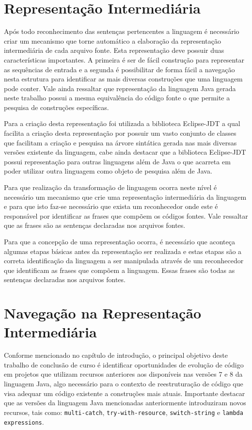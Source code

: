 \section{Representação Intermediária}\label{sec:parser}
Após todo reconhecimento das sentenças pertencentes a linguagem é necessário criar um mecanismo que torne automático a elaboração da representação intermediária de cada arquivo fonte. Esta representação deve possuir duas características importantes. A primeira é ser de fácil construção para representar as sequências de entrada e a segunda é possibilitar de forma fácil a navegação nesta estrutura para identificar as mais diversas construções que uma linguagem pode conter. Vale ainda ressaltar que representação da linguagem Java gerada neste trabalho possui a mesma equivalência do código fonte o que permite a pesquisa de construções específicas. 

Para a criação desta representação foi utilizada a biblioteca Eclipse-JDT a qual facilita a criação desta representação por possuir um vasto conjunto de classes que facilitam a criação e pesquisa na árvore sintática gerada nas mais diversas versões existente da linguagem, cabe ainda destacar que a biblioteca Eclipse-JDT possui representação para outras linguagens além de Java o que acarreta em poder utilizar outra linguagem como objeto de pesquisa além de Java.
 
Para que realização da transformação de linguagem ocorra neste nível é necessário um mecanismo que crie uma representação intermediária da linguagem e para que isto faz-se necessário que exista um reconhecedor onde este é responsável por identificar as frases que compõem os códigos fontes. Vale ressaltar que as frases são as sentenças declaradas nos arquivos fontes.

Para que a concepção de uma representação ocorra, é necessário que aconteça algumas etapas básicas antes da representação ser realizada e estas etapas são a correta identificação da linguagem a ser manipulada através de um reconhecedor que identificam as frases que compõem a linguagem. Essas frases são todas as sentenças declaradas nos arquivos fontes.


\section{Navegação na Representação Intermediária}\label{sec:visitor}
Conforme mencionado no capítulo de introdução, o principal objetivo deste trabalho de conclusão de curso é identificar oportunidades de evolução de código  em projetos que utilizam recursos anteriores aos disponíveis nas versões 7 e 8 da linguagem Java, algo necessário para o contexto de reestruturação de código que visa adequar um código existente a construções mais atuais. Importante destacar que as versões da linguagem Java mencionadas anteriormente introduziram novos recursos, tais como: \texttt{multi-catch}, \texttt{try-with-resource}, \texttt{switch-string} e \texttt{lambda expressions}.

